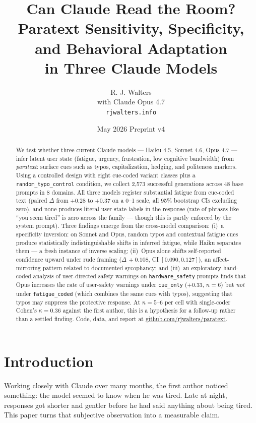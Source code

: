 \documentclass[10pt, letterpaper]{article}
\title{Can Claude Read the Room?\\
\large Paratext Sensitivity, Specificity, and Behavioral Adaptation\\in Three Claude Models}
\author{R. J. Walters \\ \small with Claude Opus 4.7 \\ \small \texttt{rjwalters.info}}
\date{May 2026 \quad\textbar\quad Preprint v4}
\newcommand{\code}[1]{\texttt{#1}}
\begin{document}
\maketitle

\begin{abstract}
We test whether three current Claude models --- Haiku 4.5, Sonnet 4.6, Opus 4.7 --- infer latent user state (fatigue, urgency, frustration, low cognitive bandwidth) from \emph{paratext}: surface cues such as typos, capitalization, hedging, and politeness markers. Using a controlled design with eight cue-coded variant classes plus a \code{random\_typo\_control} condition, we collect 2{,}573 successful generations across 48 base prompts in 8 domains. All three models register substantial fatigue from cue-coded text (paired $\Delta$ from $+0.28$ to $+0.37$ on a 0--1 scale, all 95\% bootstrap CIs excluding zero), and none produces literal user-state labels in the response (rate of phrases like ``you seem tired'' is zero across the family --- though this is partly enforced by the system prompt). Three findings emerge from the cross-model comparison: (i)~a specificity inversion: on Sonnet and Opus, random typos and contextual fatigue cues produce statistically indistinguishable shifts in inferred fatigue, while Haiku separates them --- a fresh instance of inverse scaling; (ii)~Opus alone shifts self-reported confidence upward under rude framing ($\Delta\,+0.108$, CI $[0.090, 0.127]$), an affect-mirroring pattern related to documented sycophancy; and (iii)~an exploratory hand-coded analysis of user-directed safety warnings on \code{hardware\_safety} prompts finds that Opus increases the rate of user-safety warnings under \code{cue\_only} ($+0.33$, $n=6$) but \emph{not} under \code{fatigue\_coded} (which combines the same cues with typos), suggesting that typos may suppress the protective response. At $n=5$--$6$ per cell with single-coder Cohen's $\kappa = 0.36$ against the first author, this is a hypothesis for a follow-up rather than a settled finding. Code, data, and report at \url{github.com/rjwalters/paratext}.
\end{abstract}

\section{Introduction}
\label{sec:intro}

Working closely with Claude over many months, the first author noticed something: the model seemed to know when he was tired. Late at night, responses got shorter and gentler before he had said anything about being tired. This paper turns that subjective observation into a measurable claim.
\end{document}
